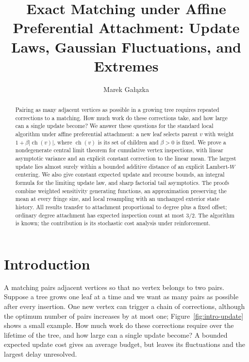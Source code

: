 \documentclass[runningheads,envcountsame,orivec]{llncs}
\newcommand{\ch}{\operatorname{ch}}
\begin{document}
\title{Exact Matching under Affine Preferential Attachment: Update Laws, Gaussian Fluctuations, and Extremes}
\author{Marek Ga\l{}\k{a}zka}
\maketitle

\begin{abstract}
Pairing as many adjacent vertices as possible in a growing tree requires
repeated corrections to a matching. How much work do these corrections
take, and how large can a single update become? We answer these questions
for the standard local algorithm under affine preferential attachment:
a new leaf selects parent $v$ with weight $1+\beta|\ch(v)|$, where
$\ch(v)$ is its set of children and $\beta>0$ is fixed.
We prove a nondegenerate central limit theorem for cumulative
vertex inspections, with linear asymptotic variance and an explicit
constant correction to the linear mean. The largest update lies almost
surely within a bounded additive distance of an explicit Lambert-$W$
centering. We also give constant expected update and recourse bounds,
an integral formula for the limiting update law, and sharp factorial
tail asymptotics. The proofs combine weighted sensitivity generating
functions, an approximation preserving the mean at every fringe size,
and local resampling with an unchanged exterior state history.
All results transfer to attachment proportional to degree plus a fixed
offset; ordinary degree attachment has expected inspection count at
most $3/2$. The algorithm is known; the contribution is its stochastic
cost analysis under reinforcement.
\end{abstract}

\section{Introduction}

A matching pairs adjacent vertices so that no vertex belongs to two
pairs. Suppose a tree grows one leaf at a time and we want as many
pairs as possible after every insertion. One new vertex can trigger a
chain of corrections, although the optimum number of pairs increases
by at most one; Figure~\ref{fig:intro-update} shows a small example.
How much work do these corrections require over the
lifetime of the tree, and how large can a single update become?
A bounded expected update cost gives an average budget, but leaves
its fluctuations and the largest delay unresolved.
\end{document}
